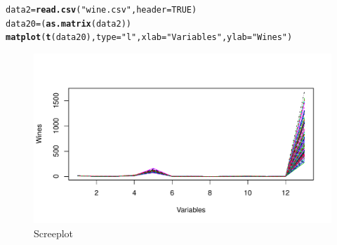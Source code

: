 \documentclass[12pt, leqno]{article}\usepackage[]{graphicx}\usepackage[]{color}
\makeatletter
\def\maxwidth{ %
  \ifdim\Gin@nat@width>\linewidth
    \linewidth
  \else
    \Gin@nat@width
  \fi
}
\newcommand{\hlnum}[1]{\textcolor[rgb]{0.686,0.059,0.569}{#1}}%
\newcommand{\hlstr}[1]{\textcolor[rgb]{0.192,0.494,0.8}{#1}}%
\newcommand{\hlstd}[1]{\textcolor[rgb]{0.345,0.345,0.345}{#1}}%
\newcommand{\hlkwb}[1]{\textcolor[rgb]{0.69,0.353,0.396}{#1}}%
\newcommand{\hlkwc}[1]{\textcolor[rgb]{0.333,0.667,0.333}{#1}}%
\newcommand{\hlkwd}[1]{\textcolor[rgb]{0.737,0.353,0.396}{\textbf{#1}}}%
\newenvironment{kframe}{%
 \def\at@end@of@kframe{}%
 \ifinner\ifhmode%
  \def\at@end@of@kframe{\end{minipage}}%
  \begin{minipage}{\columnwidth}%
 \fi\fi%
 \def\FrameCommand##1{\hskip\@totalleftmargin \hskip-\fboxsep
 \colorbox{shadecolor}{##1}\hskip-\fboxsep
     \hskip-\linewidth \hskip-\@totalleftmargin \hskip\columnwidth}%
 \MakeFramed {\advance\hsize-\width
   \@totalleftmargin\z@ \linewidth\hsize
   \@setminipage}}%
 {\par\unskip\endMakeFramed%
 \at@end@of@kframe}
\newenvironment{knitrout}{}{} %
\makeatother
\begin{document}
\begin{knitrout}
\color{fgcolor}\begin{kframe}
\begin{alltt}
\hlstd{data2} \hlkwb{=} \hlkwd{read.csv}\hlstd{(}\hlstr{"wine.csv"}\hlstd{,} \hlkwc{header}\hlstd{=}\hlnum{TRUE}\hlstd{)}
\hlstd{data20} \hlkwb{=} \hlstd{(}\hlkwd{as.matrix}\hlstd{(data2))}
\hlkwd{matplot}\hlstd{(}\hlkwd{t}\hlstd{(data20),}\hlkwc{type} \hlstd{=} \hlstr{"l"}\hlstd{,} \hlkwc{xlab} \hlstd{=} \hlstr{"Variables"}\hlstd{,} \hlkwc{ylab} \hlstd{=} \hlstr{"Wines"}\hlstd{)}
\end{alltt}
\end{kframe}\begin{figure}[H]
\includegraphics[width=\maxwidth]{figure/p2a-1} \caption[Screeplot]{Screeplot}\label{fig:p2a}
\end{figure}


\end{knitrout}
\end{document}
